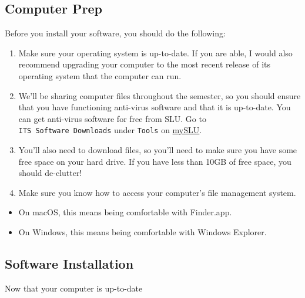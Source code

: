 \documentclass[]{book}
\providecommand{\tightlist}{%
  \setlength{\itemsep}{0pt}\setlength{\parskip}{0pt}}
\theoremstyle{definition}
\theoremstyle{definition}
\theoremstyle{remark}
\begin{document}
\subsection{Computer Prep}\label{computer-prep}

Before you install your software, you should do the following:

\begin{enumerate}
\def\labelenumi{\arabic{enumi}.}
\item
  Make sure your operating system is up-to-date. If you are able, I
  would also recommend upgrading your computer to the most recent
  release of its operating system that the computer can run.
\item
  We'll be sharing computer files throughout the semester, so you should
  ensure that you have functioning anti-virus software and that it is
  up-to-date. You can get anti-virus software for free from SLU. Go to
  \texttt{ITS\ Software\ Downloads} under \texttt{Tools} on
  \href{https://myslu.slu.edu/tools}{mySLU}.
\item
  You'll also need to download files, so you'll need to make sure you
  have some free space on your hard drive. If you have less than 10GB of
  free space, you should de-clutter!
\item
  Make sure you know how to access your computer's file management
  system.
\end{enumerate}

\begin{itemize}
\tightlist
\item
  On macOS, this means being comfortable with Finder.app.
\item
  On Windows, this means being comfortable with Windows Explorer.
\end{itemize}

\subsection{Software Installation}\label{software-installation}

Now that your computer is up-to-date
\end{document}
